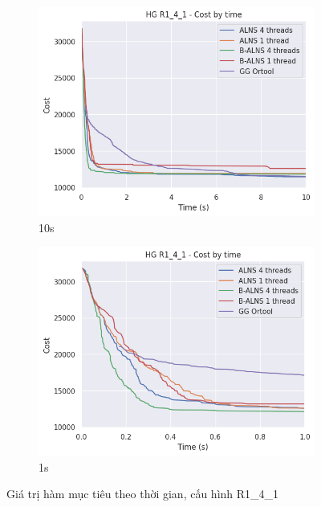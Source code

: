 \begin{figure}[H] %
  \label{fig:perf_ct_r1}
  \begin{subfigure}{.5\textwidth}
    \centering
    \includegraphics[width=1\linewidth]{figures/cost_time_10s_R1_4_1.png}
    \caption{10s}
    \label{fig:perf_ct_r1_60s}
  \end{subfigure}%
  \begin{subfigure}{.5\textwidth}
    \centering
    \includegraphics[width=1\linewidth]{figures/cost_time_1s_R1_4_1.png}
    \caption{1s}
    \label{fig:perf_ct_r1_10s}
  \end{subfigure}
  \caption{Giá trị hàm mục tiêu theo thời gian, cấu hình R1\_4\_1}
\end{figure}

